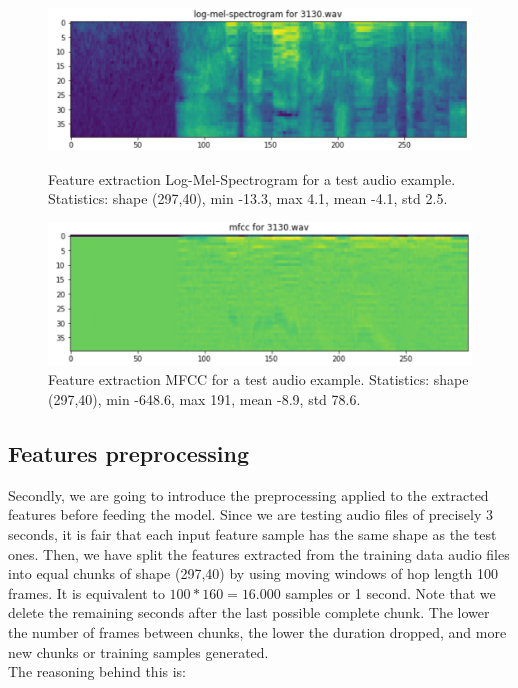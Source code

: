 \documentclass[12pt]{extarticle}
\begin{document}
\begin{figure}[h]
\centering
\includegraphics[width=\linewidth]{Figures/1.png}
\caption{Feature extraction Log-Mel-Spectrogram for a test audio example. Statistics: shape (297,40), min -13.3, max 4.1, mean -4.1, std 2.5.}
\label{fig1}
\vspace{1cm}
\includegraphics[width=\linewidth]{Figures/2.png}
\caption{Feature extraction MFCC for a test audio example. Statistics: shape (297,40), min -648.6, max 191, mean -8.9, std 78.6.}
\label{fig2}
\end{figure}

\subsection{Features preprocessing}

Secondly, we are going to introduce the preprocessing applied to the extracted features before feeding the model. Since we are testing audio files of precisely 3 seconds, it is fair that each input feature sample has the same shape as the test ones. Then, we have split the features extracted from the training data audio files into equal chunks of shape (297,40) by using moving windows of hop length 100 frames. It is equivalent to $100*160=16.000$ samples or 1 second. Note that we delete the remaining seconds after the last possible complete chunk. The lower the number of frames between chunks, the lower the duration dropped, and more new chunks or training samples generated.\\

\noindent The reasoning behind this is:
\end{document}
